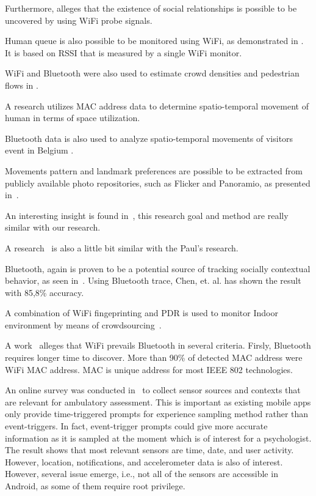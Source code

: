 \documentclass{article}
\begin{document}
Furthermore, \cite{thesis014} alleges that the existence of social relationships is possible to be uncovered by using WiFi probe signals.

Human queue is also possible to be monitored using WiFi, as demonstrated in \cite{thesis012}. It is based on RSSI that is measured by a single WiFi monitor.

WiFi and Bluetooth were also used to estimate crowd densities and pedestrian flows in \cite{thesis011}.

A research \cite{thesis017} utilizes MAC address data to determine spatio-temporal movement of human in terms of space utilization.

Bluetooth data is also used to analyze spatio-temporal movements of visitors event in Belgium \cite{thesis016}.

Movements pattern and landmark preferences are possible to be extracted from publicly available photo repositories, such as Flicker and Panoramio, as presented in~\cite{thesis026}.

An interesting insight is found in~\cite{thesis031}, this research goal and method are really similar with our research.

A research~\cite{thesis030} is also a little bit similar with the Paul's research.

Bluetooth, again is proven to be a potential source of tracking socially contextual behavior, as seen in~\cite{thesis028}. Using Bluetooth trace, Chen, et. al. has shown the result with 85,8\% accuracy.

A combination of WiFi fingeprinting and PDR is used to monitor Indoor environment by means of crowdsourcing~\cite{thesis020}.

A work~\cite{thesis009} alleges that WiFi prevails Bluetooth in several criteria. Firsly, Bluetooth requires longer time to discover. More than 90\% of detected MAC address were WiFi MAC address. MAC is unique address for most IEEE 802 technologies.

An online survey was conducted in~\cite{thesis001} to collect sensor sources and contexts that are relevant for ambulatory assessment. This is important as existing mobile apps only provide time-triggered prompts for experience sampling method rather than event-triggers. In fact, event-trigger prompts could give more accurate information as it is sampled at the moment which is of interest for a psychologist. The result shows that most relevant sensors are time, date, and user activity. However, location, notifications, and accelerometer data is also of interest. However, several issue emerge, i.e., not all of the sensors are accessible in Android, as some of them require root privilege.
\end{document}
